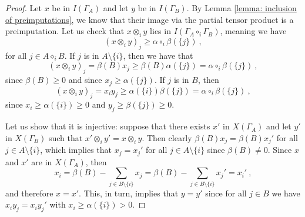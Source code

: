 \documentclass[a4paper,12pt]{amsart}
\begin{document}
\begin{proof}
Let $x$ be in $I(\Gamma_A)$ and let $y$ be in $I(\Gamma_B)$. By Lemma \ref{lemma: inclusion of preimputations}, we know that their image via the partial tensor product is a preimputation. Let us check that $x \otimes_i y$ lies in $I(\Gamma_A \circ_i \Gamma_B)$, meaning we have 
\[
(x \otimes_i y)_j \geq \alpha \circ_i \beta(\{j\})~,
\]
for all $j \in A \diamond_i B$. If $j$ is in $A \setminus \{i\}$, then we have that 
\[
(x \otimes_i y)_j = \beta(B)x_j \geq \beta(B)\alpha(\{j\}) = \alpha \circ_i \beta(\{j\})~,
\]
since $\beta(B) \geq 0$ and since $x_j \geq \alpha(\{j\})$. If $j$ is in $B$, then 
\[
(x \otimes_i y)_j = x_iy_j \geq \alpha(\{i\})\beta(\{j\}) = \alpha \circ_i \beta(\{j\})~, 
\]
since $x_i \geq \alpha(\{i\}) \geq 0$ and $y_j \geq \beta(\{j\}) \geq 0$. 

\medskip

Let us show that it is injective: suppose that there exists $x'$ in $X(\Gamma_A)$ and let $y'$ in $X(\Gamma_B)$ such that $x' \otimes_i y' = x \otimes_i y$. Then clearly $\beta(B)x_j = \beta(B)x_j'$ for all $j \in A \setminus\{i\}$, which implies that $x_j = x_j'$ for all $j \in A \setminus\{i\}$ since $\beta(B) \neq 0$. Since $x$ and $x'$ are in $X(\Gamma_A)$, then 
\[
x_i = \beta(B) - \sum_{j \in B \setminus \{i\}} x_j = \beta(B) - \sum_{j \in B \setminus \{i\}} x_j' = x_i'~,  
\]
and therefore $x = x'$. This, in turn, implies that $y = y'$ since for all $j \in B$ we have $x_i y_j = x_i y_j'$ with $x_i \geq \alpha(\{i\}) > 0.$
\end{proof}
\end{document}
